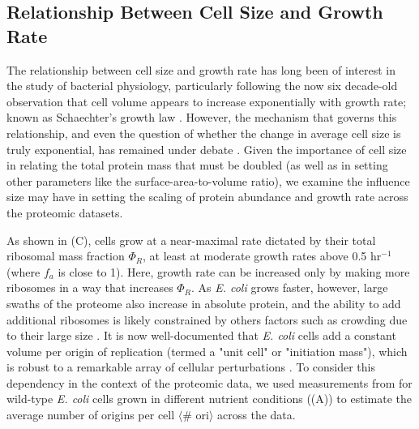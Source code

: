 
\subsection{Relationship Between Cell Size and Growth Rate}
The relationship between cell size and growth rate has long been of interest
in the study of bacterial physiology, particularly following the now six
decade-old observation that cell volume appears to increase exponentially
with growth rate; known as Schaechter's growth law \citep{schaechter1958,
taheriaraghi2015}. However, the mechanism that governs this relationship, and
even the question of whether the change in average cell size is truly
exponential, has remained under debate \citep{harris2018}. Given the
importance of cell size in relating the total protein mass that must be
doubled (as well as in setting other parameters like the
surface-area-to-volume ratio), we examine the influence size may have in
setting the scaling of protein abundance and growth rate across the
proteomic datasets.

As shown in (C), cells grow at a near-maximal rate dictated
by their total ribosomal mass fraction $\Phi_R$, at least at moderate growth
rates above 0.5 hr$^{-1}$ (where $f_a$ is close to 1). Here,  growth rate can be
increased only by making more ribosomes in a way that increases  $\Phi_R$. As
\textit{E. coli} grows faster, however, large swaths of the proteome also
increase in absolute protein, and the ability to add additional ribosomes is
likely constrained by others factors such as  crowding due to their large size
\citep{delarue2018, solerbistue2020}. It is now well-documented that
\textit{E. coli} cells add a constant volume per origin of replication (termed a
"unit cell" or "initiation mass"), which is robust to a remarkable array of
cellular perturbations \citep{si2017}. To consider this dependency in the context of the
proteomic data, we used measurements from \cite{si2017} for wild-type
\textit{E. coli} cells grown in different nutrient conditions
((A)) to estimate the average number of origins per
cell $\langle$\# ori$\rangle$ across the data.

